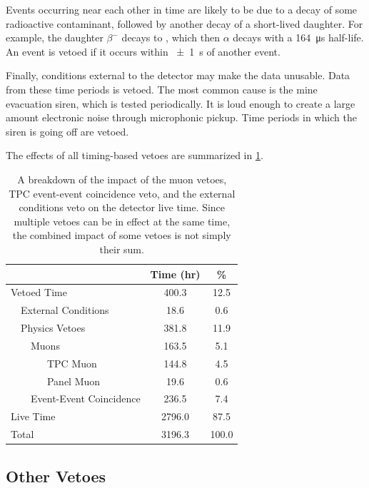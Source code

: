 \documentclass[herrin-thesis.tex]{subfiles}
\begin{document}
Events occurring near each other in time are likely to be due to a decay of some radioactive contaminant, followed by another decay of a short-lived daughter. For example, the  daughter  \(\beta^{-}\) decays to , which then \(\alpha\) decays with a \SI{164}{\micro\s} half-life.  An event is vetoed if it occurs within \SI{\pm1}{\s} of another event.

Finally, conditions external to the detector may make the data unusable. Data from these time periods is vetoed. The most common cause is the mine evacuation siren, which is tested periodically. It is loud enough to create a large amount electronic noise through microphonic pickup. Time periods in which the siren is going off are vetoed.

The effects of all timing-based vetoes are summarized in \cref{tab:analysis_veto_effects}.

\begin{table}[htbp]
\centering
\caption[Impact of timing-based vetoes]{A breakdown of the impact of the muon vetoes, TPC event-event coincidence veto, and the external conditions veto on the detector live time. Since multiple vetoes can be in effect at the same time, the combined impact of some vetoes is not simply their sum.}
\label{tab:analysis_veto_effects}
\begin{tabular}{l l l l c c}\toprule
\multicolumn{4}{c}{}							&	Time (\si{hr})	&	\%	\\\midrule
\multicolumn{4}{l}{Vetoed Time}				&	400.3		&	12.5	\\
	&\multicolumn{3}{l}{External Conditions}		&	18.6			&	0.6	\\
	&\multicolumn{3}{l}{Physics Vetoes}			&	381.8		&	11.9	\\
	&&\multicolumn{2}{l}{Muons}				&	163.5		&	5.1	\\
	&&&TPC Muon							&	144.8		&	4.5	\\
	&&&Panel Muon						&	19.6			&	0.6	\\
	&&\multicolumn{2}{l}{Event-Event Coincidence}&	236.5		&	7.4	\\
\multicolumn{4}{l}{Live Time}					&	2796.0		&	87.5	\\\midrule
\multicolumn{4}{l}{Total}						&	3196.3		&	100.0\\\bottomrule
\end{tabular}
\end{table}

\subsection{Other Vetoes}
\end{document}

